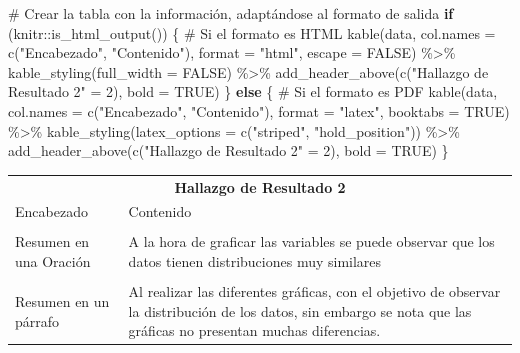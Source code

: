 \documentclass[
  letterpaper,
  DIV=11,
  numbers=noendperiod]{scrreprt}
\newenvironment{Shaded}{\begin{snugshade}}{\end{snugshade}}
\newcommand{\AttributeTok}[1]{\textcolor[rgb]{0.40,0.45,0.13}{#1}}
\newcommand{\CommentTok}[1]{\textcolor[rgb]{0.37,0.37,0.37}{#1}}
\newcommand{\ConstantTok}[1]{\textcolor[rgb]{0.56,0.35,0.01}{#1}}
\newcommand{\ControlFlowTok}[1]{\textcolor[rgb]{0.00,0.23,0.31}{\textbf{#1}}}
\newcommand{\DecValTok}[1]{\textcolor[rgb]{0.68,0.00,0.00}{#1}}
\newcommand{\FunctionTok}[1]{\textcolor[rgb]{0.28,0.35,0.67}{#1}}
\newcommand{\NormalTok}[1]{\textcolor[rgb]{0.00,0.23,0.31}{#1}}
\newcommand{\OtherTok}[1]{\textcolor[rgb]{0.00,0.23,0.31}{#1}}
\newcommand{\SpecialCharTok}[1]{\textcolor[rgb]{0.37,0.37,0.37}{#1}}
\newcommand{\StringTok}[1]{\textcolor[rgb]{0.13,0.47,0.30}{#1}}
\begin{document}
\begin{Shaded}
\begin{Highlighting}[]
\CommentTok{\# Crear la tabla con la información, adaptándose al formato de salida}
\ControlFlowTok{if}\NormalTok{ (knitr}\SpecialCharTok{::}\FunctionTok{is\_html\_output}\NormalTok{()) \{}
  \CommentTok{\# Si el formato es HTML}
  \FunctionTok{kable}\NormalTok{(data, }\AttributeTok{col.names =} \FunctionTok{c}\NormalTok{(}\StringTok{"Encabezado"}\NormalTok{, }\StringTok{"Contenido"}\NormalTok{), }
        \AttributeTok{format =} \StringTok{"html"}\NormalTok{, }
        \AttributeTok{escape =} \ConstantTok{FALSE}\NormalTok{) }\SpecialCharTok{\%\textgreater{}\%}
    \FunctionTok{kable\_styling}\NormalTok{(}\AttributeTok{full\_width =} \ConstantTok{FALSE}\NormalTok{) }\SpecialCharTok{\%\textgreater{}\%}
    \FunctionTok{add\_header\_above}\NormalTok{(}\FunctionTok{c}\NormalTok{(}\StringTok{"Hallazgo de Resultado 2"} \OtherTok{=} \DecValTok{2}\NormalTok{), }\AttributeTok{bold =} \ConstantTok{TRUE}\NormalTok{)}
\NormalTok{\} }\ControlFlowTok{else}\NormalTok{ \{}
  \CommentTok{\# Si el formato es PDF}
  \FunctionTok{kable}\NormalTok{(data, }\AttributeTok{col.names =} \FunctionTok{c}\NormalTok{(}\StringTok{"Encabezado"}\NormalTok{, }\StringTok{"Contenido"}\NormalTok{), }
        \AttributeTok{format =} \StringTok{"latex"}\NormalTok{, }
        \AttributeTok{booktabs =} \ConstantTok{TRUE}\NormalTok{) }\SpecialCharTok{\%\textgreater{}\%}
    \FunctionTok{kable\_styling}\NormalTok{(}\AttributeTok{latex\_options =} \FunctionTok{c}\NormalTok{(}\StringTok{"striped"}\NormalTok{, }\StringTok{"hold\_position"}\NormalTok{)) }\SpecialCharTok{\%\textgreater{}\%}
    \FunctionTok{add\_header\_above}\NormalTok{(}\FunctionTok{c}\NormalTok{(}\StringTok{"Hallazgo de Resultado 2"} \OtherTok{=} \DecValTok{2}\NormalTok{), }\AttributeTok{bold =} \ConstantTok{TRUE}\NormalTok{)}
\NormalTok{\}}
\end{Highlighting}
\end{Shaded}

\begin{table}[!h]
\centering
\begin{tabular}{ll}
\toprule
\multicolumn{2}{c}{\textbf{Hallazgo de Resultado 2}} \\
\cmidrule(l{3pt}r{3pt}){1-2}
Encabezado & Contenido\\
\midrule
\cellcolor{gray!10}{Nombre de Su hallazgo} & \cellcolor{gray!10}{Datos muy Iguales}\\
Resumen en una Oración & A la hora de graficar las variables se puede observar que los datos tienen distribuciones muy similares\\
\cellcolor{gray!10}{Problemas o Posibles Desafíos} & \cellcolor{gray!10}{Este problema se puede estar ocasionando debido a que las variables de la base de datos se parecen mucho.}\\
Resumen en un párrafo & Al realizar las diferentes gráficas, con el objetivo de observar la distribución de los datos, sin embargo se nota que las gráficas no presentan muchas diferencias.\\
\bottomrule
\end{tabular}
\end{table}
\end{document}
